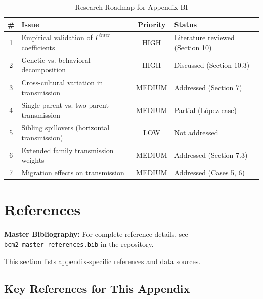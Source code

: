 \begin{table}[htbp]
\centering
\caption{Research Roadmap for Appendix BI}
\label{tab:BI-roadmap}
\renewcommand{\arraystretch}{1.3}
\begin{tabular}{@{}clcl@{}}
\toprule
\textbf{\#} & \textbf{Issue} & \textbf{Priority} & \textbf{Status} \\
\midrule
1 & Empirical validation of $\Gamma^{inter}$ coefficients & HIGH & Literature reviewed (Section 10) \\
2 & Genetic vs. behavioral decomposition & HIGH & Discussed (Section 10.3) \\
3 & Cross-cultural variation in transmission & MEDIUM & \cellcolor{green!20}Addressed (Section 7) \\
4 & Single-parent vs. two-parent transmission & MEDIUM & Partial (López case) \\
5 & Sibling spillovers (horizontal transmission) & LOW & Not addressed \\
6 & Extended family transmission weights & MEDIUM & \cellcolor{green!20}Addressed (Section 7.3) \\
7 & Migration effects on transmission & MEDIUM & \cellcolor{green!20}Addressed (Cases 5, 6) \\
\bottomrule
\end{tabular}
\end{table}


\section{References}
\label{sec:BI-references}

\begin{tcolorbox}[colback=blue!5!white, colframe=blue!75!black]
\textbf{Master Bibliography:} For complete reference details, see
\texttt{bcm2\_master\_references.bib} in the repository.

This section lists appendix-specific references and data sources.
\end{tcolorbox}

\vspace{0.5em}

\subsection{Key References for This Appendix}

